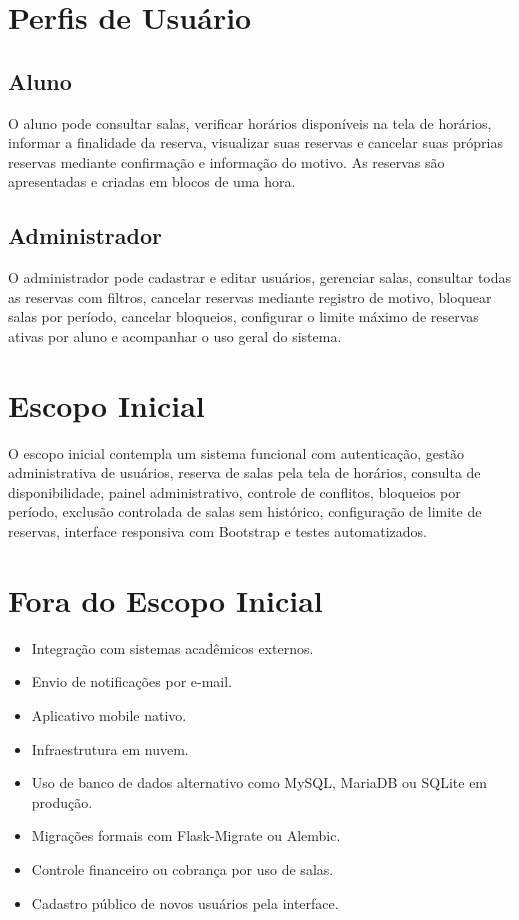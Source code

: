 \documentclass[12pt,a4paper]{article}
\begin{document}
\section{Perfis de Usuário}

\subsection{Aluno}

O aluno pode consultar salas, verificar horários disponíveis na tela de horários, informar a finalidade da reserva, visualizar suas reservas e cancelar suas próprias reservas mediante confirmação e informação do motivo. As reservas são apresentadas e criadas em blocos de uma hora.

\subsection{Administrador}

O administrador pode cadastrar e editar usuários, gerenciar salas, consultar todas as reservas com filtros, cancelar reservas mediante registro de motivo, bloquear salas por período, cancelar bloqueios, configurar o limite máximo de reservas ativas por aluno e acompanhar o uso geral do sistema.

\section{Escopo Inicial}

O escopo inicial contempla um sistema funcional com autenticação, gestão administrativa de usuários, reserva de salas pela tela de horários, consulta de disponibilidade, painel administrativo, controle de conflitos, bloqueios por período, exclusão controlada de salas sem histórico, configuração de limite de reservas, interface responsiva com Bootstrap e testes automatizados.

\section{Fora do Escopo Inicial}

\begin{itemize}
    \item Integração com sistemas acadêmicos externos.
    \item Envio de notificações por e-mail.
    \item Aplicativo mobile nativo.
    \item Infraestrutura em nuvem.
    \item Uso de banco de dados alternativo como MySQL, MariaDB ou SQLite em produção.
    \item Migrações formais com Flask-Migrate ou Alembic.
    \item Controle financeiro ou cobrança por uso de salas.
    \item Cadastro público de novos usuários pela interface.
\end{itemize}
\end{document}
